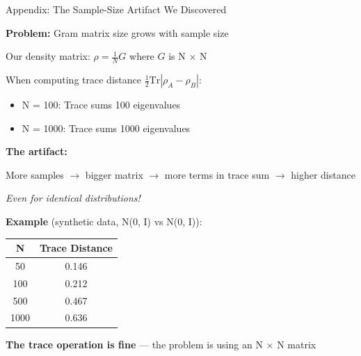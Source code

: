 \documentclass[aspectratio=169,11pt]{beamer}
\begin{document}
\begin{frame}{Appendix: The Sample-Size Artifact We Discovered}

\textbf{Problem:} Gram matrix size grows with sample size

\vspace{0.5em}

Our density matrix: $\rho = \frac{1}{N} G$ where $G$ is N $\times$ N

\vspace{0.3em}

When computing trace distance $\frac{1}{2}\text{Tr}|\rho_A - \rho_B|$:
\begin{itemize}
  \item N = 100: Trace sums 100 eigenvalues
  \item N = 1000: Trace sums 1000 eigenvalues
\end{itemize}

\vspace{0.5em}

\textbf{The artifact:}

More samples $\to$ bigger matrix $\to$ more terms in trace sum $\to$ higher distance

\emph{Even for identical distributions!}

\vspace{0.5em}

\textbf{Example} (synthetic data, N(0, I) vs N(0, I)):

\begin{center}
\begin{tabular}{cc}
\toprule
\textbf{N} & \textbf{Trace Distance} \\
\midrule
50 & 0.146 \\
100 & 0.212 \\
500 & 0.467 \\
1000 & 0.636 \\
\bottomrule
\end{tabular}
\end{center}

\vspace{0.3em}

\textbf{The trace operation is fine} — the problem is using an N $\times$ N matrix

\end{frame}
\end{document}
